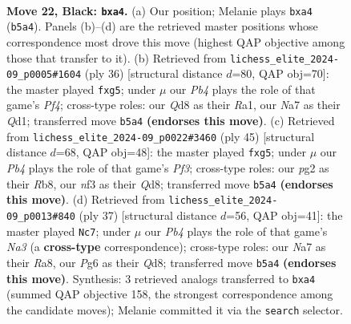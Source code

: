 \documentclass[11pt]{article}
\begin{document}
\clearpage

\begin{figure}[p]\centering
\begin{subfigure}{0.46\textwidth}\centering
\resizebox{\linewidth}{!}{%
\newchessgame
\chessboard[
  setfen={1r1q1b2/n1p1r2k/p2p1pp1/1p1Pp2p/PP2P3/3PRN1P/3B1PP1/RQ3K2 b - - 0 22},
  showmover=false,
  pgfstyle=straightmove, color=movearrow, markmove={b5-a4}
]}
\caption{}
\end{subfigure}\hfill
\begin{subfigure}{0.46\textwidth}\centering
\resizebox{\linewidth}{!}{%
\newchessgame
\chessboard[
  setfen={1r1q1rk1/5pp1/3pbn2/2p3p1/pp1pPP2/P2P2NP/1PP3BK/R2Q1R2 w - - 0 19},
  showmover=false,
  pgfstyle=straightmove, color=movearrow, markmove={f4-g5}
]}
\caption{}
\end{subfigure}
\\[4pt]
\begin{subfigure}{0.46\textwidth}\centering
\resizebox{\linewidth}{!}{%
\newchessgame
\chessboard[
  setfen={1r1qnrk1/1p4b1/p2p1pp1/P1pPp1Pp/2P1P3/R1N3PK/1P3P2/2BQR3 b - - 0 23},
  showmover=false,
  pgfstyle=straightmove, color=movearrow, markmove={f6-g5}
]}
\caption{}
\end{subfigure}\hfill
\begin{subfigure}{0.46\textwidth}\centering
\resizebox{\linewidth}{!}{%
\newchessgame
\chessboard[
  setfen={r2q1r2/1p1bppk1/n1pp2p1/p2P2Np/P1BP3P/2P2P2/1P1Q2P1/R4RK1 b - - 2 19},
  showmover=false,
  pgfstyle=straightmove, color=movearrow, markmove={a6-c7}
]}
\caption{}
\end{subfigure}
\caption{\textbf{Move 22, Black: \texttt{bxa4}.} (a) Our position; Melanie plays \texttt{bxa4} (\texttt{b5a4}). Panels (b)--(d) are the retrieved master positions whose correspondence most drove this move (highest QAP objective among those that transfer to it). (b) Retrieved from \texttt{lichess\_elite\_2024-09\_p0005\#1604} (ply 36) [structural distance $d$=80, QAP obj=70]: the master played \texttt{fxg5}; under $\mu$ our \emph{Pb4} plays the role of that game's \emph{Pf4}; cross-type roles: our \emph{Q}d8 as their \emph{R}a1, our \emph{N}a7 as their \emph{Q}d1; transferred move \texttt{b5a4} \textbf{(endorses this move)}. (c) Retrieved from \texttt{lichess\_elite\_2024-09\_p0022\#3460} (ply 45) [structural distance $d$=68, QAP obj=48]: the master played \texttt{fxg5}; under $\mu$ our \emph{Pb4} plays the role of that game's \emph{Pf3}; cross-type roles: our \emph{p}g2 as their \emph{R}b8, our \emph{n}f3 as their \emph{Q}d8; transferred move \texttt{b5a4} \textbf{(endorses this move)}. (d) Retrieved from \texttt{lichess\_elite\_2024-09\_p0013\#840} (ply 37) [structural distance $d$=56, QAP obj=41]: the master played \texttt{Nc7}; under $\mu$ our \emph{Pb4} plays the role of that game's \emph{Na3} (a \textbf{cross-type} correspondence); cross-type roles: our \emph{N}a7 as their \emph{R}a8, our \emph{P}g6 as their \emph{Q}d8; transferred move \texttt{b5a4} \textbf{(endorses this move)}. Synthesis: 3 retrieved analogs transferred to \texttt{bxa4} (summed QAP objective 158, the strongest correspondence among the candidate moves); Melanie committed it via the \texttt{search} selector.}
\label{fig:thought-m43}
\end{figure}
\end{document}
